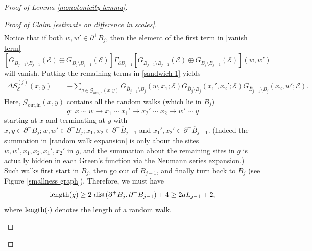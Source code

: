 \documentclass[11pt,reqno,UTF8,twoside]{amsart}
\newcommand{\length}{{\rm length}}
\newcommand{\mcE}{\mathcal{E}}
\newcommand{\mcG}{\mathcal{G}}
\newcommand{\barB}{\overline{B}}
\newcommand{\diffSj}{\Delta {S}^{(j)}}
\newcommand{\dist}{{\rm dist}}
\theoremstyle{definition}
\numberwithin{equation}{section}
\begin{document}
\begin{proof}[Proof of Lemma \ref{monotonicity lemma}]
\begin{proof}[Proof of Claim \ref{estimate on difference in scales}]
{\begin{align}
  \end{align}
  }
  Notice that if both $w,w'\in \partial^+ B_j$, then the element of the first term in \eqref{vanish term}
  \[[G_{\barB_{j-1}\setminus B_{j-1}}(\mcE) \oplus G_{\barB_{j}\setminus \barB_{j-1}}(\mcE) ]  \Gamma_{\partial \barB_{j-1}} [G_{\barB_{j-1}\setminus B_{j-1}}(\mcE) \oplus G_{\barB_{j}\setminus \barB_{j-1}}(\mcE) ] (w,w')\]
  will vanish. Putting  the remaining terms  in \eqref{sandwich 1} yields 
  \begin{align}\label{random walk expansion}
      \diffSj_\mcE (x,y) &= - \sum_{g\in \mcG_{\text{out,in}}(x,y) } G_{\barB_{j-1}\setminus B_{j}}(w,x_1;\mcE)   G_{\barB_j\setminus B_j}(x_1',x_2';\mcE)  G_{\barB_{j-1}\setminus B_{j}}(x_2,w';\mcE).  
  \end{align} 
  Here, $\mcG_{\text{out,in}}(x,y)$ contains all the random walks (which lie in $\barB_j$)
  \[g:\ x\sim w\rightarrow x_1\sim x_1'\rightarrow x_2' \sim x_2\rightarrow w'\sim y \]
  starting at $x$ and terminating at $y$ with $x,y\in \partial^-B_j;  w,w'\in \partial^+ B_j;  x_1,x_2\in \partial^-\barB_{j-1}$ and $x_1',x_2'\in \partial^+\barB_{j-1}$.  (Indeed the summation in \eqref{random walk expansion} is only about the sites $w,w',x_1,x_2,x_1',x_2'$ in $g$, and the summation about the remaining sites in $g$ is actually hidden in each Green's function via the Neumann series expansion.)  Such walks first start in $B_j$, then go out of $\barB_{j-1}$, and finally turn back to  $B_j$ (see Figure  \ref{smallness graph}). Therefore, we must have 
  \begin{equation}\label{length of in and out path}
    \length(g)\geq 2\ \dist(\partial^+ B_j ,\partial^-\barB_{j-1})+4 \geq 2a L_{j-1}+2, 
  \end{equation}
where $\length(\cdot)$ denotes the length of a random walk. 




  \begin{figure}[htbp]
    \centering 

    


\begin{tikzpicture}[x=0.75pt,y=0.75pt,yscale=-0.85,xscale=0.85]


\end{tikzpicture}
\end{figure}
\end{proof}
\end{proof}
\end{document}
